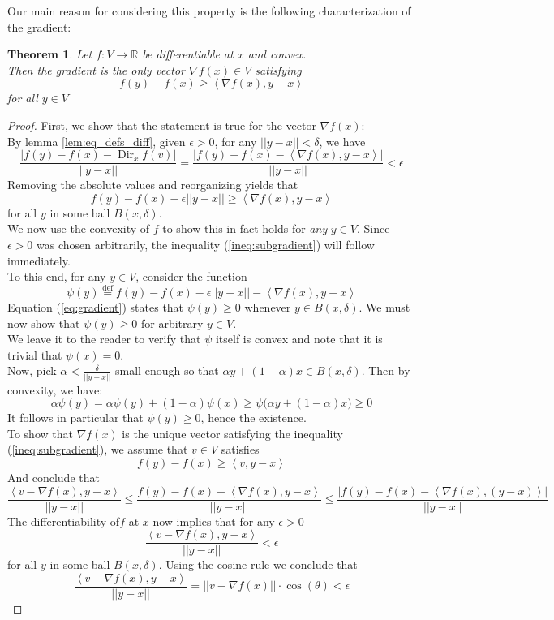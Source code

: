 \documentclass{book}
\theoremstyle{plain}
\newtheorem{theorem}[corollary]{Theorem}
\theoremstyle{definition}
\newcommand{\bl}[2]{\left\langle #1,#2\right\rangle}
\renewcommand{\d}[1]{\mathbb{#1}}
\DeclareMathOperator{\Dir}{Dir}
\newcommand{\define}{\stackrel{\operatorname{def}}{=}}
\newcommand{\mor}{\longrightarrow}
\begin{document}
\noindent Our main reason for considering this property is the following characterization of the gradient:
\begin{theorem}\label{thm:gradient=subgradient}
Let $f:V\mor \d{R}$ be differentiable at $x$ and convex.\\
Then the gradient is the only vector $\nabla f(x) \in V$ satisfying
\begin{equation}\label{ineq:subgradient}
f(y)-f(x)\ge \bl{\nabla f(x)}{ y-x}
\end{equation}
for all $y \in V$
\end{theorem}

\begin{proof}
\noindent First, we show that the statement is true for the vector $\nabla f(x)$:\\
By lemma \ref{lem:eq_defs_diff}, given $\epsilon>0$, for any $\vert \vert y-x \vert \vert <\delta $, we have
\[
\frac{\vert f(y)-f(x)-\Dir_x f(v) \vert }{\vert\vert y-x\vert\vert}= \frac{\vert f(y)-f(x)- \bl{\nabla f(x)}{y-x} \vert }{\vert\vert y-x\vert\vert}<\epsilon
\]
Removing the absolute values and reorganizing yields that
\[
f(y)-f(x)-\epsilon\vert \vert y-x\vert \vert \ge \bl{\nabla f(x)}{y-x}
\]
for all $y$ in some ball $B(x,\delta)$.\\
 We  now use the convexity of $f$ to show this in fact holds for \emph{any} $y \in V$. Since $\epsilon >0$ was chosen arbitrarily, the inequality (\ref{ineq:subgradient}) will follow immediately. \\
To this end, for any $y \in V$, consider the function
\begin{equation}\label{eq:gradient}
\psi(y)\define  f(y)-f(x)-\epsilon\vert\vert y-x\vert \vert - \bl{\nabla f(x)}{y-x}
\end{equation}
Equation (\ref{eq:gradient}) states that $\psi(y)\ge 0$ whenever $y \in B(x,\delta)$. We must now show that $\psi (y)\ge 0$ for arbitrary $y \in V$.\\
We leave it to the reader to verify that $\psi$ itself is convex and note that it is trivial that $\psi(x)=0$.\\ 
Now, pick $\alpha< \frac{\delta}{\vert \vert y-x\vert \vert }$ small enough so that $\alpha y+(1-\alpha )x \in B(x,\delta)$. Then by convexity, we have:
\[
\alpha \psi(y)=\alpha \psi(y)+(1-\alpha)\psi(x)\ge \psi\big(\alpha y+(1-\alpha)x\big)\ge 0
\]
It follows in particular that $\psi(y)\ge 0$, hence the existence.\\
To show that $\nabla f(x)$ is the unique vector satisfying the inequality (\ref{ineq:subgradient}), we assume  that $v \in V$ satisfies
\[
f(y)-f(x)\ge \bl{v}{ y-x}
\]
And conclude that
\[
\frac{\bl{ v-\nabla f(x)}{y-x} }{\vert \vert y-x \vert\vert }\le \frac{f(y)-f(x)-\bl{\nabla f(x)}{y-x} }{\vert \vert y-x \vert\vert }\le \frac{\vert f(y)-f(x)-\bl{\nabla f(x)}{(y-x)}\vert }{\vert \vert y-x\vert \vert}
\]
The differentiability of$f$ at $x$ now implies that for any $\epsilon>0$
\[
\frac{\bl{ v-\nabla f(x)}{y-x} }{\vert \vert y-x \vert\vert }<\epsilon
\]
for all $y$ in some ball $B(x,\delta)$. Using the cosine rule we conclude  that \[\frac{\bl{ v-\nabla f(x)}{y-x}}{\vert \vert y-x\vert \vert}=\vert \vert v-\nabla f(x)\vert \vert  \cdot \cos(\theta)<\epsilon\]


\end{proof}
\end{document}

